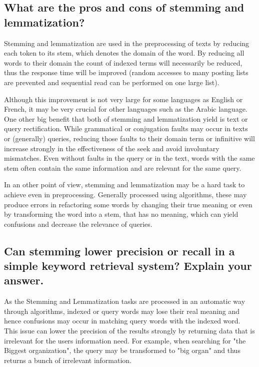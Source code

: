 \documentclass{scrartcl}
\begin{document}
\subsection{What are the pros and cons of stemming and lemmatization?}

Stemming and lemmatization are used in the preprocessing of texts by reducing each token to its stem, which denotes the domain of the word. By reducing all words to their domain the count of indexed terms will necessarily be reduced, thus the response time will be improved (random accesses to many posting lists are prevented and sequential read can be performed on one large list).

Although this improvement is not very large for some languages as English or French, it may be very crucial for other languages such as the Arabic language. One other big benefit that both of stemming and lemmatization yield is text or query rectification. While grammatical or conjugation faults may occur in texts or (generally) queries, reducing those faults to their domain term or infinitive will increase strongly in the effectiveness of the seek and avoid involuntary mismatches. Even without faults in the query or in the text, words with the same stem often contain the same information and are relevant for the same query.

In an other point of view, stemming and lemmatization may be a hard task to achieve even in preprocessing. Generally processed using algorithms, these may produce errors in refactoring some words by changing their true meaning or even by transforming the word into a stem, that has no meaning, which can yield confusions and decrease the relevance of queries.

\subsection{Can stemming lower precision or recall in a simple keyword retrieval system? Explain your answer.}

As the Stemming and Lemmatization tasks are processed in an automatic way through algorithms, indexed or query words may lose their real meaning and hence confusions may occur in matching query words with the indexed word. This issue can lower the precision of the results strongly by returning data that is irrelevant for the users information need. For example, when searching for "the Biggest organization", the query may be transformed to "big organ" and thus returns a bunch of irrelevant information.
\end{document}
